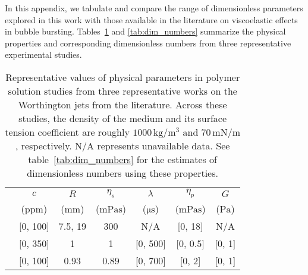 \documentclass[]{article}
\begin{document}
\begin{enumerate}
In this appendix, we tabulate and compare the range of dimensionless parameters explored in this work with those available in the literature on viscoelastic effects in bubble bursting. Tables~\ref{tab:ExpOnlydim_numbers} and \ref{tab:dim_numbers} summarize the physical properties and corresponding dimensionless numbers from three representative experimental studies.

\begin{table}
	\begin{center}
		\begin{tabular}{lcccccc}
			\hline
			&$c$ & $R$ & $\eta_s$  & $\lambda$ & $\eta_p$ & $G$ \\
			& (ppm) & ($\si{\milli\meter}$) & ($\si{\milli\pascal\second}$) & ($\si{\micro\second}$) & ($\si{\milli\pascal\second}$) & ($\si{\pascal}$) \\[3pt]
			\citet{cheny1996extravagant} & [0, 100]  & 7.5, 19  & 300   & N/A & [0, 18] & N/A \\
			\citet{rodriguez2023bubble} & [0, 350] & 1 & 1  & [0, 500] & [0, 0.5] & [0, 1] \\
			\citet{cabalganteeffect} & [0, 100] & 0.93 & 0.89 & [0, 700] & [0, 2] &[0, 1] \\
			\hline
		\end{tabular}
		\caption{Representative values of physical parameters in polymer solution studies from three representative works on the Worthington jets from the literature. Across these studies, the density of the medium and its surface tension coefficient are roughly $1000\,\si{\kilogram}/\si{\cubic\meter}$ and $70\,\si{\milli\newton}/\si{\meter}$, respectively. N/A represents unavailable data. See table~\ref{tab:dim_numbers} for the estimates of dimensionless numbers using these properties.}
		\label{tab:ExpOnlydim_numbers}
	\end{center}
\end{table}


\end{enumerate}
\end{document}
